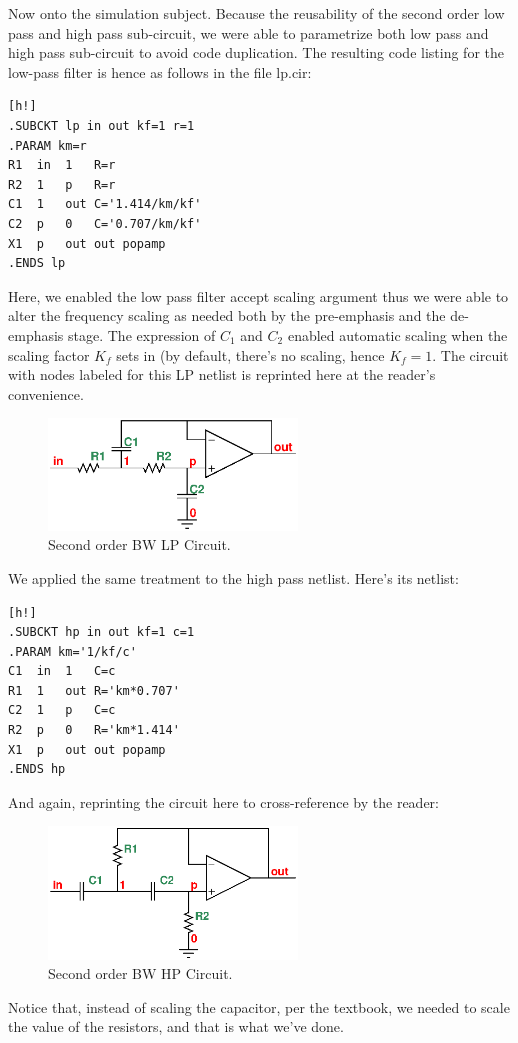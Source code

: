 \documentclass[a4paper]{IEEEtran}
\begin{document}
		Now onto the simulation subject. Because the reusability of the second order low pass and high pass sub-circuit, we were able to parametrize both low pass and high pass sub-circuit to avoid code duplication. The resulting code listing for the low-pass filter is hence as follows in the file lp.cir:
		\begin{center}
		\begin{lstlisting}[caption=2nd order BW LP netlist.][h!]
.SUBCKT lp in out kf=1 r=1
.PARAM km=r
R1	in	1	R=r
R2	1	p	R=r
C1	1	out	C='1.414/km/kf'
C2	p	0	C='0.707/km/kf'
X1	p	out	out	popamp
.ENDS lp
		\end{lstlisting}
		\end{center}
		Here, we enabled the low pass filter accept scaling argument thus we were able to alter the frequency scaling as needed both by the pre-emphasis and the de-emphasis stage. The expression of $C_1$ and $C_2$ enabled automatic scaling when the scaling factor $K_f$ sets in (by default, there's no scaling, hence $K_f=1$. The circuit with nodes labeled for this LP netlist is reprinted here at the reader's convenience.
		\begin{center}
			\begin{figure}[h!]
					\label{lp.cir}
					\includegraphics[width=250px]{lp.eps}
					\caption{Second order BW LP Circuit.}
			\end{figure}
		\end{center}
		We applied the same treatment to the high pass netlist. Here's its netlist:
		\begin{center}
		\begin{lstlisting}[caption=2nd order BW HP netlist.][h!]
.SUBCKT hp in out kf=1 c=1
.PARAM km='1/kf/c'
C1	in	1	C=c
R1	1	out	R='km*0.707'
C2	1	p	C=c
R2	p	0	R='km*1.414'
X1	p	out	out	popamp
.ENDS hp
		\end{lstlisting}
		\end{center}
		And again, reprinting the circuit here to cross-reference by the reader:
		\begin{center}
			\begin{figure}[h!]
					\label{hp.cir}
					\includegraphics[width=250px]{hp.eps}
					\caption{Second order BW HP Circuit.}
			\end{figure}
		\end{center}
		Notice that, instead of scaling the capacitor, per the textbook, we needed to scale the value of the resistors, and that is what we've done.
		
\end{document}
